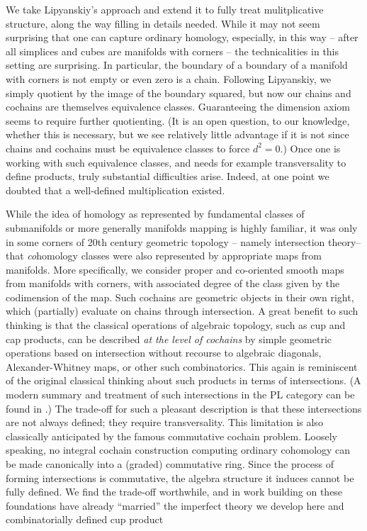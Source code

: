 We take Lipyanskiy's approach and extend it to fully treat mulitplicative structure, along the way filling in details needed.  While it may not seem
surprising that one can capture ordinary homology, especially, in this way -- after all simplices and cubes are manifolds with corners -- 
the technicalities in this setting are surprising.  In particular, the boundary of a boundary of a manifold with corners is not empty or even zero is a chain.  
Following Lipyanskiy, we simply quotient by the  image of the  boundary squared, but now our chains and cochains are themselves equivalence classes.
Guaranteeing the dimension axiom seems to require further quotienting.  (It is an open question, to our knowledge, whether this is necessary,
but we see relatively little advantage if it is not since chains and cochains must be equivalence classes to force $d^2 = 0$.)   Once one is working with
such equivalence classes, and needs for example transversality to define products, truly substantial difficulties arise.  Indeed, at one point we 
doubted that a well-defined multiplication existed.

While the idea of homology as represented by fundamental classes of submanifolds or more generally manifolds mapping is highly familiar, 
it was only in some  corners of 20th century geometric topology -- namely intersection theory--  that \textit{co}homology classes were also  represented by appropriate maps from manifolds. More specifically, we consider proper and co-oriented smooth maps from manifolds with corners, 
with associated degree of the class given by the codimension of the map.
Such cochains are geometric objects in their own right, which (partially) evaluate on chains through intersection.
A great benefit to such thinking is that the classical operations of algebraic topology, such as cup and cap products, can be described \textit{at the level of cochains} by simple geometric operations based on intersection without recourse to algebraic diagonals, Alexander-Whitney maps, or other such combinatorics.
This again is reminiscent of the original classical thinking about such products in terms of intersections.
(A modern summary and treatment of such intersections in the PL category can be found in \cite{McC06}.)
The trade-off for such a pleasant description is that these intersections are not always defined; they require transversality.
This limitation is also classically anticipated by the famous commutative cochain problem.  
Loosely speaking, no integral cochain construction computing ordinary cohomology can be made canonically into a (graded) commutative ring.
Since the process of forming intersections is commutative, the algebra structure it induces cannot be fully defined.  We find the trade-off worthwhile,
and in  work building on these foundations 
 \cite{FMS-flows}  have already ``married'' the imperfect theory we develop here and combinatorially defined cup product 


